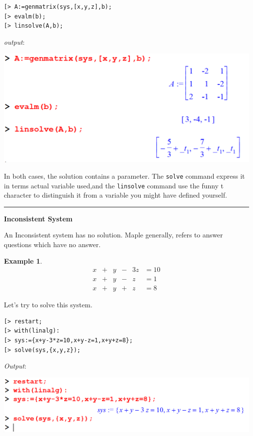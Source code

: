 \documentclass[
]{book}
\theoremstyle{definition}
\theoremstyle{definition}
\newtheorem{example}{Example}[chapter]
\theoremstyle{definition}
\theoremstyle{definition}
\theoremstyle{remark}
\begin{document}
\begin{verbatim}
[> A:=genmatrix(sys,[x,y,z],b);
[> evalm(b);
[> linsolve(A,b);
\end{verbatim}

\emph{output}:

\includegraphics{figures/Lesson 5/fig10.png}

In both cases, the solution contains a parameter.
The \texttt{solve} command express it in terms actual variable used,and the \texttt{linsolve} command use the funny t character to distinguish it from a variable you might have defined yourself.

\begin{center}\rule{0.5\linewidth}{0.5pt}\end{center}

\textbf{Inconsistent System}

An Inconsistent system has no solution. Maple generally, refers to answer questions which have no answer.

\begin{example}
\protect\hypertarget{exm:unnamed-chunk-2}{}\label{exm:unnamed-chunk-2}\[
\begin{array}{ccccccccc}
x &+& y &-& 3z &= 10\\
x &+& y &-&  z &= 1\\
x &+& y &+&  z &= 8  
\end{array}
\]
\end{example}

Let's try to solve this system.

\begin{verbatim}
[> restart;
[> with(linalg):
[> sys:={x+y-3*z=10,x+y-z=1,x+y+z=8};
[> solve(sys,{x,y,z});
\end{verbatim}

\emph{Output}:

\includegraphics{figures/Lesson 5/fig11.png}
\end{document}
